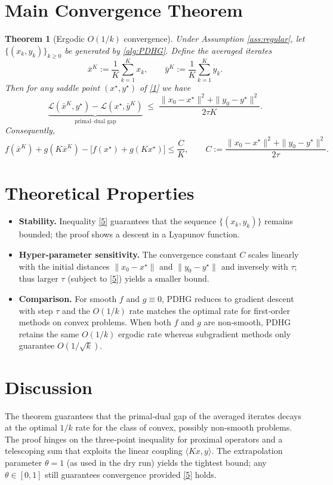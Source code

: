 \documentclass[11pt]{article}
\newtheorem{theorem}{Theorem}
\newcommand{\norm}[1]{\|#1\|}
\begin{document}
\section*{Main Convergence Theorem}
\begin{theorem}[Ergodic $O(1/k)$ convergence]\label{thm:ergodic}
Under Assumption \ref{ass:regular}, let $\{(x_k,y_k)\}_{k\ge0}$ be generated by \eqref{alg:PDHG}. Define the averaged iterates
\[
\bar{x}^{K}:=\frac{1}{K}\sum_{k=1}^{K}x_k,\qquad 
\bar{y}^{K}:=\frac{1}{K}\sum_{k=1}^{K}y_k .
\]
Then for any saddle point $(x^{\star},y^{\star})$ of \eqref{1} we have
\[
\underbrace{\mathcal{L}(\bar{x}^{K},y^{\star})-\mathcal{L}(x^{\star},\bar{y}^{K})}_{\text{primal–dual gap}}
\;\le\;
\frac{\norm{x_0-x^{\star}}^{2}+ \norm{y_0-y^{\star}}^{2}}{2\tau K}.
\tag{6}
\]
Consequently,
\[
f(\bar{x}^{K})+g(K\bar{x}^{K})- \bigl[f(x^{\star})+g(Kx^{\star})\bigr]
\le \frac{C}{K},\qquad C:=\frac{\norm{x_0-x^{\star}}^{2}+ \norm{y_0-y^{\star}}^{2}}{2\tau}.
\]
\end{theorem}

\section*{Theoretical Properties}
\begin{itemize}
\item \textbf{Stability.} Inequality \eqref{5} guarantees that the sequence $\{(x_k,y_k)\}$ remains bounded; the proof shows a descent in a Lyapunov function.
\item \textbf{Hyper‑parameter sensitivity.} The convergence constant $C$ scales linearly with the initial distances $\|x_0-x^{\star}\|$ and $\|y_0-y^{\star}\|$ and inversely with $\tau$; thus larger $\tau$ (subject to \eqref{5}) yields a smaller bound.
\item \textbf{Comparison.} For smooth $f$ and $g\equiv0$, PDHG reduces to gradient descent with step $\tau$ and the $O(1/k)$ rate matches the optimal rate for first‑order methods on convex problems. When both $f$ and $g$ are non‑smooth, PDHG retains the same $O(1/k)$ ergodic rate whereas subgradient methods only guarantee $O(1/\sqrt{k})$.
\end{itemize}

\section*{Discussion}
The theorem guarantees that the primal‑dual gap of the averaged iterates decays at the optimal $1/k$ rate for the class of convex, possibly non‑smooth problems. The proof hinges on the three‑point inequality for proximal operators and a telescoping sum that exploits the linear coupling $\langle Kx,y\rangle$. The extrapolation parameter $\theta=1$ (as used in the dry run) yields the tightest bound; any $\theta\in[0,1]$ still guarantees convergence provided \eqref{5} holds.
\end{document}
